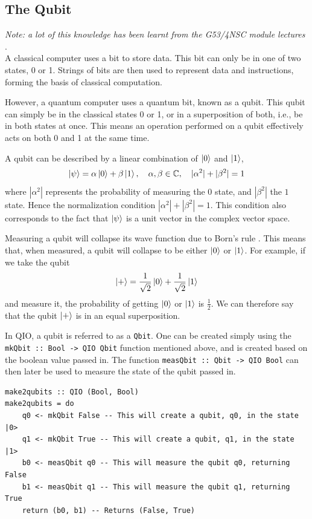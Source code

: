 \documentclass[a4paper,11pt, titlepage, twoside]{article}
\begin{document}
\subsection{The Qubit}
\textit{Note: a lot of this knowledge has been learnt from the G53/4NSC module lectures \cite{nsc}}.\noindent \\ 
A classical computer uses a bit to store data. This bit can only be in one of two states, 0 or 1. Strings of bits are then used to represent data and instructions, forming the basis of classical computation.\par
However, a quantum computer uses a quantum bit, known as a qubit. This qubit can simply be in the classical states 0 or 1, or in a superposition of both, i.e., be in both states at once. This means an operation performed on a qubit effectively acts on both 0 and 1 at the same time.\par
A qubit can be described by a linear combination of $\ket{0}$ and $\ket{1}$, 
$$\ket{\psi}=\alpha\ket{0} + \beta\ket{1},\quad \alpha,\beta \in \mathbb{C},\quad |\alpha^2| + |\beta^2| = 1$$
where $ |\alpha^2|$ represents the probability of measuring the $0$ state, and $|\beta^2|$ the $1$ state. Hence the normalization condition $|\alpha^2| + |\beta^2| = 1$. This condition also corresponds to the fact that $\ket{\psi}$ is a unit vector in the complex vector space.\par
Measuring a qubit will collapse its wave function due to Born's rule \cite{born}. This means that, when measured, a qubit will collapse to be either $\ket{0}$ or $\ket{1}$. For example, if we take the qubit
$$\ket{+} = \frac{1}{\sqrt{2}}\ket{0} + \frac{1}{\sqrt{2}}\ket{1}$$
and measure it, the probability of getting $\ket{0}$ or $\ket{1}$ is $\frac{1}{2}$. We can therefore say that the qubit $\ket{+}$ is in an equal superposition.\par
In QIO, a qubit is referred to as a \texttt{Qbit}. One can be created simply using the \texttt{mkQbit :: Bool -> QIO Qbit} function mentioned above, and is created based on the boolean value passed in. The function \texttt{measQbit :: Qbit -> QIO Bool} can then later be used to measure the state of the qubit passed in.
\begin{verbatim}
make2qubits :: QIO (Bool, Bool)
make2qubits = do
    q0 <- mkQbit False -- This will create a qubit, q0, in the state |0>
    q1 <- mkQbit True -- This will create a qubit, q1, in the state |1>
    b0 <- measQbit q0 -- This will measure the qubit q0, returning False
    b1 <- measQbit q1 -- This will measure the qubit q1, returning True
    return (b0, b1) -- Returns (False, True)
\end{verbatim}
\end{document}
